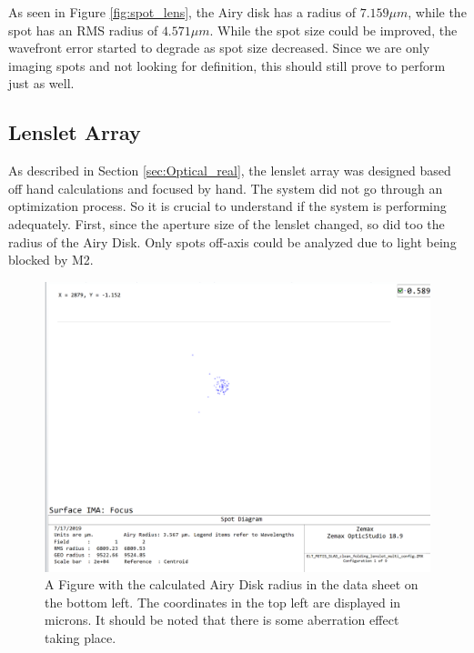 As seen in Figure \ref{fig:spot_lens}, the Airy disk has a radius of $7.159 \mu m$,
while the spot has an RMS radius of $4.571 \mu m$.  While the spot size could be
improved, the wavefront error started to degrade as spot size decreased.  Since we 
are only imaging spots and not looking for definition, this should still prove to 
perform just as well.

\subsection{Lenslet Array}
\label{sec:lenslet_result}

As described in Section \ref{sec:Optical_real}, the lenslet array was designed based
off hand calculations and focused by hand.  The system did not go through an
optimization process.  So it is crucial to understand if the system is performing
adequately. First, since the aperture size of the lenslet changed, so did too the
radius of the Airy Disk.  Only spots off-axis could be analyzed due to light being
blocked by M2.


\begin{figure}[h!]
\centering
\includegraphics[width=10 cm]{Figures/Results/on_axis_top.png}
\caption{A Figure with the calculated Airy Disk radius in the data sheet on the bottom left.  The coordinates in the top left are displayed in microns.  It should be noted that there is some aberration effect taking place.}
\label{fig:spot_lenslet}
\end{figure}

